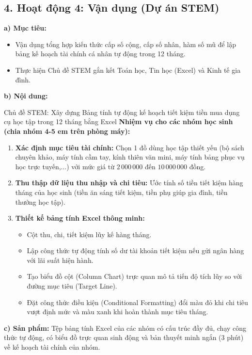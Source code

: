 \documentclass[12pt, a4paper]{article}
\begin{document}
\subsection*{4. Hoạt động 4: Vận dụng (Dự án STEM)}

\noindent \textbf{a) Mục tiêu:}
\begin{itemize}
    \item Vận dụng tổng hợp kiến thức cấp số cộng, cấp số nhân, hàm số mũ để lập bảng kế hoạch tài chính cá nhân tự động trong 12 tháng.
    \item Thực hiện Chủ đề STEM gắn kết Toán học, Tin học (Excel) và Kinh tế gia đình.
\end{itemize}

\noindent \textbf{b) Nội dung:}
\begin{stembox}{Chủ đề STEM: Xây dựng Bảng tính tự động kế hoạch tiết kiệm tiền mua dụng cụ học tập trong 12 tháng bằng Excel}
    \textbf{Nhiệm vụ cho các nhóm học sinh (chia nhóm 4-5 em trên phòng máy):}
    \begin{enumerate}
        \item \textbf{Xác định mục tiêu tài chính:} Chọn 1 đồ dùng học tập thiết yếu (bộ sách chuyên khảo, máy tính cầm tay, kính thiên văn mini, máy tính bảng phục vụ học trực tuyến,...) với mức giá từ $2\,000\,000$ đến $10\,000\,000$ đồng.
        \item \textbf{Thu thập dữ liệu thu nhập và chi tiêu:} Ước tính số tiền tiết kiệm hàng tháng của học sinh (tiền ăn sáng tiết kiệm, tiền phụ giúp gia đình, tiền thưởng học tập).
        \item \textbf{Thiết kế bảng tính Excel thông minh:}
        \begin{itemize}
            \item Cột thu, chi, tiết kiệm lũy kế hàng tháng.
            \item Lập công thức tự động tính số dư tài khoản tiết kiệm nếu gửi ngân hàng với lãi suất hiện hành.
            \item Tạo biểu đồ cột (Column Chart) trực quan mô tả tiến độ tích lũy so với đường mục tiêu (Target Line).
            \item Đặt công thức điều kiện (Conditional Formatting) đổi màu đỏ khi chi tiêu vượt định mức và màu xanh khi hoàn thành mục tiêu tháng.
        \end{itemize}
    \end{enumerate}
\end{stembox}

\noindent \textbf{c) Sản phẩm:}
Tệp bảng tính Excel của các nhóm có cấu trúc đầy đủ, chạy công thức tự động, có biểu đồ trực quan sinh động và bản thuyết minh ngắn (3 phút) về kế hoạch tài chính của nhóm.
\end{document}

